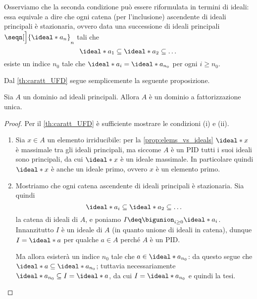 Osserviamo che la seconda condizione può essere riformulata in termini di ideali: essa equivale a dire che ogni catena (per l'inclusione) ascendente di ideali principali è stazionaria, ovvero data una successione di ideali principali $\seqn[\Big]{\ideal*{a_n}}_n$ tali che \[
    \ideal*{a_1} \subseteq \ideal*{a_2} \subseteq \dots   
\] esiste un indice $n_0$ tale che $\ideal*{a_i} = \ideal*{a_{n_0}}$ per ogni $i \geq n_0$.

Dal \autoref{th:caratt_UFD} segue semplicemente la seguente proposizione.
\begin{proposition}
     Sia $A$ un dominio ad ideali principali. Allora $A$ è un dominio a fattorizzazione unica.
\end{proposition}
\begin{proof}
    Per il \autoref{th:caratt_UFD} è sufficiente mostrare le condizioni (i) e (ii).
    \begin{enumerate}[label={(\roman*)}]
        \item Sia $x \in A$ un elemento irriducibile: per la \autoref{prop:elems_vs_ideals} $\ideal*{x}$ è massimale tra gli ideali principali, ma siccome $A$ è un PID tutti i suoi ideali sono principali, da cui $\ideal*{x}$ è un ideale massimale. In particolare quindi $\ideal*{x}$ è anche un ideale primo, ovvero $x$ è un elemento primo.
        \item Mostriamo che ogni catena ascendente di ideali principali è stazionaria. Sia quindi \[
            \ideal*{a_i} \subseteq \ideal*{a_2} \subseteq \dots    
        \] la catena di ideali di $A$, e poniamo $I \deq \bigunion_{i \geq 0} \ideal*{a_i}$. Innanzitutto $I$ è un ideale di $A$ (in quanto unione di ideali in catena), dunque $I = \ideal*{a}$ per qualche $a \in A$ perché $A$ è un PID. 
        
        Ma allora esisterà un indice $n_0$ tale che $a \in \ideal*{a_{n_0}}$: da questo segue che $\ideal*{a} \subseteq \ideal*{a_{n_0}}$; tuttavia necessariamente $\ideal*{a_{n_0}} \subseteq I = \ideal*{a}$, da cui $I = \ideal*{a_{n_0}}$ e quindi la tesi. \qedhere
    \end{enumerate}
\end{proof}